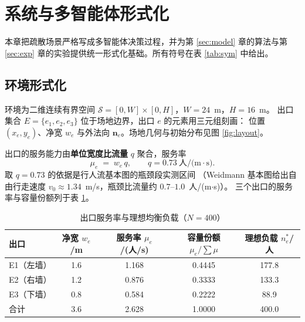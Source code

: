 %
\section{系统与多智能体形式化}
\label{sec:formal}

本章把疏散场景严格写成多智能体决策过程，并为第 \ref{sec:model} 章的算法与第
\ref{sec:exp} 章的实验提供统一形式化基础。所有符号在表 \ref{tab:sym} 中给出。

\subsection{环境形式化}
\label{sec:env}

环境为二维连续有界空间 $\mathcal S=[0,W]\times[0,H]$，$W=24$~m，$H=16$~m。
出口集合 $E=\{e_1,e_2,e_3\}$ 位于场地边界，出口 $e$ 的元素用三元组刻画：
位置 $(x_e,y_e)$、净宽 $w_e$ 与外法向 $\mathbf n_e$。场地几何与初始分布见图 \ref{fig:layout}。

出口的服务能力由\textbf{单位宽度比流量} $q$ 聚合，服务率
\begin{equation}
\mu_e \;=\; w_e\,q,
\qquad
q = 0.73\ \text{人/(m}\cdot\text{s)} .
\label{eq:mu}
\end{equation}
取 $q=0.73$ 的依据是行人流基本图的瓶颈段实测区间
（Weidmann 基本图给出自由行走速度 $v_0\approx1.34$~m/s，瓶颈比流量约
$0.7$–$1.0$~人/(m$\cdot$s)）\cite{weidmann1993,helbing1995socialforce}。
三个出口的服务率与容量份额列于表 \ref{tab:mu}。

\begin{table}[H]
  \centering
  \caption{出口服务率与理想均衡负载（$N=400$）}
  \label{tab:mu}
  \begin{tabular}{lcccc}
    \toprule
    出口 & 净宽 $w_e$/m & 服务率 $\mu_e$/(人/s) & 容量份额 $\mu_e/\sum\mu$ & 理想负载 $n_e^\ast$/人 \\
    \midrule
    E1（左墙） & 1.6 & 1.168 & 0.4445 & 177.8 \\
    E2（右墙） & 1.2 & 0.876 & 0.3333 & 133.3 \\
    E3（下墙） & 0.8 & 0.584 & 0.2222 & 88.9 \\
    \midrule
    合计 & 3.6 & 2.628 & 1.0000 & 400.0 \\
    \bottomrule
  \end{tabular}
\end{table}

